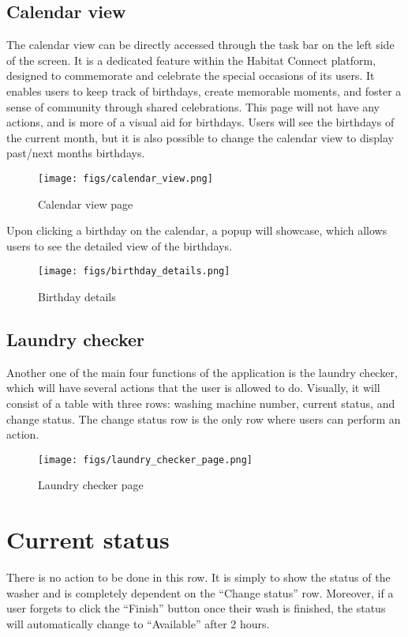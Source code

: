 \documentclass[conference]{IEEEtran}
\begin{document}
\subsection{Calendar view}
The calendar view can be directly accessed through the task bar on the left side of the screen. It is a dedicated feature within the Habitat Connect platform, designed to commemorate and celebrate the special occasions of its users. It enables users to keep track of birthdays, create memorable moments, and foster a sense of community through shared celebrations. This page will not have any actions, and is more of a visual aid for birthdays. Users will see the birthdays of the current month, but it is also possible to change the calendar view to display past/next months birthdays.
    \begin{figure}[H]
    \centering
    \texttt{[image: figs/calendar\_view.png]}
    \caption{Calendar view page}
    \label{fig:Calendar view page}
    \end{figure}
Upon clicking a birthday on the calendar, a popup will showcase, which allows users to see the detailed view of the birthdays.
    \begin{figure}[H]
    \centering
    \texttt{[image: figs/birthday\_details.png]}
    \caption{Birthday details}
    \label{fig:Birthday details}
    \end{figure}


\subsection{Laundry checker}
Another one of the main four functions of the application is the laundry checker, which will have several actions that the user is allowed to do. Visually, it will consist of a table with three rows: washing machine number, current status, and change status. The change status row is the only row where users can perform an action.
    \begin{figure}[H]
    \centering
    \texttt{[image: figs/laundry\_checker\_page.png]}
    \caption{Laundry checker page}
    \label{fig:Laundry checker page}
    \end{figure}

\section*{Current status}
There is no action to be done in this row. It is simply to show the status of the washer and is completely dependent on the “Change status” row. Moreover, if a user forgets to click the “Finish” button once their wash is finished, the status will automatically change to “Available” after 2 hours.
\end{document}
